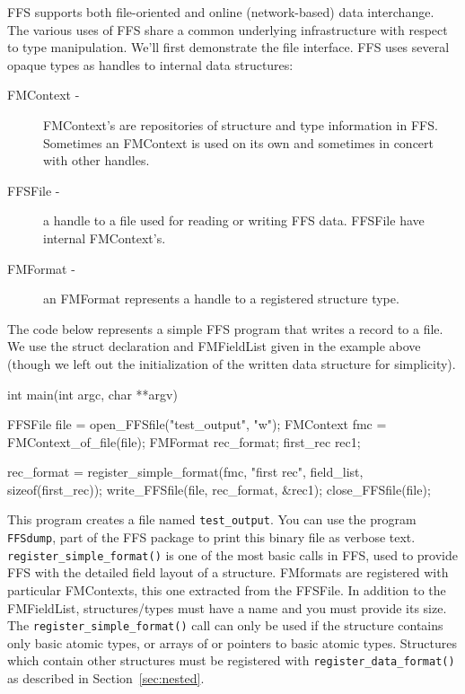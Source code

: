 FFS supports both file-oriented and online (network-based) data
interchange.  The various uses of FFS share a common underlying
infrastructure with respect to type manipulation.  We'll first demonstrate
the file interface.  FFS uses several opaque types as handles to internal
data structures:
\begin{description}
\item[FMContext -] FMContext's are repositories of structure and type
  information in FFS.   Sometimes an FMContext is used on its own and
  sometimes in concert with other handles.
\item[FFSFile -] a handle to a file used for reading or writing FFS data.
  FFSFile have internal FMContext's.
\item[FMFormat - ] an FMFormat represents a handle to a registered structure
  type.
\end{description}
The code below represents a simple FFS program that writes a record to a
file.  We use the struct declaration and FMFieldList given in the example
above (though we left out the initialization of the written data structure
for simplicity).
\begin{WrapCode}
int main(int argc, char **argv)
{
    FFSFile file = open_FFSfile("test_output", "w");
    FMContext fmc = FMContext_of_file(file);
    FMFormat rec_format;
    first_rec rec1;

    rec_format = register_simple_format(fmc, "first rec", field_list, sizeof(first_rec));
    write_FFSfile(file, rec_format, &rec1);
    close_FFSfile(file);
}
\end{WrapCode}
This program creates a file named {\tt test\_output}.  You can use the
program {\tt FFSdump}, part of the FFS package to print this binary file as
verbose text.  {\tt register\_simple\_format()} is one of the most basic calls
in FFS, used to provide FFS with the detailed field layout of a structure.
FMformats are registered with particular FMContexts, this one extracted from
the FFSFile.  In addition to the FMFieldList, structures/types must have a
name and you must provide its size.  The {\tt register\_simple\_format()} call
can only be used if the structure contains only basic atomic types, or arrays of
or pointers to basic atomic types.  Structures which contain other
structures must be registered with {\tt register\_data\_format()} as
described in Section~\ref{sec:nested}.

